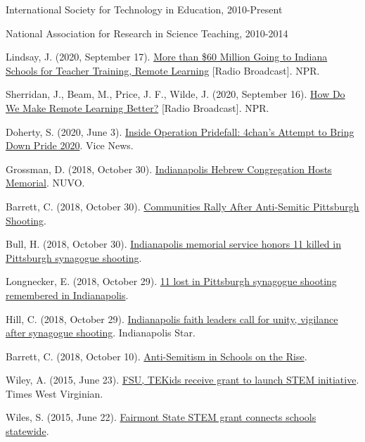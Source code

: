 \documentclass[11pt,article,oneside]{memoir}
\begin{document}
\ind International Society for Technology in Education, 2010-Present

\ind National Association for Research in Science Teaching, 2010-2014

\bigskip 

\medskip

\ind Lindsay, J. (2020, September 17). \href{https://indianapublicradio.org/news/2020/09/more-than-60-million-going-to-indiana-schools-for-teacher-training-remote-learning/}{More than \$60 Million Going to Indiana Schools for Teacher Training, Remote Learning} [Radio Broadcast]. NPR.

\ind Sherridan, J., Beam, M., Price, J. F., Wilde, J. (2020, September 16). \href{https://www.wfyi.org/programs/all-in/radio/How-Do-We-Make-Remote-Learning-Better}{How Do We Make Remote Learning Better?} [Radio Broadcast]. NPR.

\ind Doherty, S. (2020, June 3). \href{https://www.vice.com/en/article/7kpbba/operation-pridefall-4chan-gay-pride-2020}{Inside Operation Pridefall: 4chan’s Attempt to Bring Down Pride 2020}. Vice News.

\ind Grossman, D. (2018, October 30). \href{https://www.nuvo.net/news/indianapolis-hebrew-congregation-hosts-memorial/article\_a8535dba-dc02-11e8-8fe3-3b450433c062.html}{Indianapolis Hebrew Congregation Hosts Memorial}. NUVO.

\ind Barrett, C. (2018, October 30). \href{https://www.npr.org/podcasts/500005/npr-news-now}{Communities Rally After Anti-Semitic Pittsburgh Shooting}.

\ind Bull, H. (2018, October 30). \href{https://fox59.com/2018/10/29/indianapolis-memorial-service-honors-11-killed-in-pittsburgh-synagogue-shooting/}{Indianapolis memorial service honors 11 killed in Pittsburgh synagogue shooting}.

\ind Longnecker, E. (2018, October 29). \href{https://www.wthr.com/article/11-lost-pittsburgh-synagogue-shooting-remembered-indianapolis}{11 lost in Pittsburgh synagogue shooting remembered in Indianapolis}.

\ind Hill, C. (2018, October 29). \href{https://www.indystar.com/story/news/2018/10/29/indy-faith-leaders-call-unity-after-pittsburgh-synagogue-shooting/1814436002/}{Indianapolis faith leaders call for unity, vigilance after synagogue shooting}. Indianapolis Star.

\ind Barrett, C. (2018, October 10). \href{https://www.wfyi.org/news/articles/anti-semitism-in-schools-on-the-rise}{Anti-Semitism in Schools on the Rise}.

\ind Wiley, A. (2015, June 23). \href{https://www.timeswv.com/news/fsu-tekids-receive-grant-to-launch-stem-initiative/article\_a40e27f6-1961-11e5-b55b-abc0377fd2ff.html
}{FSU, TEKids receive grant to launch STEM initiative}. Times West Virginian.

\ind Wiles, S. (2015, June 22). \href{https://wajr.com/fairmont-state-stem-grant-connects-schools-statewide/}{Fairmont State STEM grant connects schools statewide}.


\end{document}
